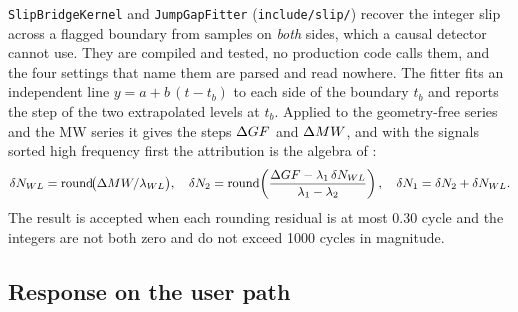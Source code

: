 \documentclass[main.tex]{subfiles}
\begin{document}
\texttt{SlipBridgeKernel} and \texttt{JumpGapFitter} (\texttt{include/slip/})
recover the integer slip across a flagged boundary from samples on \emph{both}
sides, which a causal detector cannot use.  They are compiled and tested, no
production code calls them, and the four settings that name them are parsed
and read nowhere.  The fitter fits an independent line
$y = a + b\,(t - t_b)$ to each side of the boundary $t_b$ and reports the step
of the two extrapolated levels at $t_b$.  Applied to the geometry-free series
and the MW series it gives the steps $\Delta GF$ and $\Delta MW$, and with the
signals sorted high frequency first the attribution is the algebra of
:
\begin{equation}
\delta N_{WL} = \operatorname{round}\!\bigl(\Delta MW/\lambda_{WL}\bigr),
\quad
\delta N_2 = \operatorname{round}\!\left(\frac{\Delta GF - \lambda_1\,\delta N_{WL}}{\lambda_1 - \lambda_2}\right),
\quad
\delta N_1 = \delta N_2 + \delta N_{WL} .
\end{equation}
The result is accepted when each rounding residual is at most 0.30 cycle and
the integers are not both zero and do not exceed 1000 cycles in magnitude.

\subsection{Response on the user path}\label{sec:slip-user-response}
\end{document}
